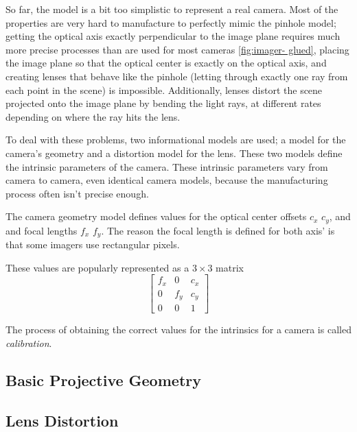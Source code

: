 So far, the model is a bit too simplistic to represent a real camera. Most of
the properties are very hard to manufacture to perfectly mimic the pinhole
model; getting the optical axis exactly perpendicular to the image plane
requires much more precise processes than are used for most cameras
\ref{fig:imager- glued}, placing the image plane so that the optical center is
exactly on the optical axis, and creating lenses that behave like the pinhole
(letting through exactly one ray from each point in the scene) is impossible.
Additionally, lenses distort the scene projected onto the image plane by
bending the light rays, at different rates depending on where the ray hits the
lens.

To deal with these problems, two informational models are used; a model for
the camera's geometry and a distortion model for the lens. These two models
define the intrinsic parameters of the camera. These intrinsic parameters vary
from camera to camera, even identical camera models, because the manufacturing
process often isn't precise enough.

The camera geometry model defines values for the optical center offsets $c_x$
$c_y$, and and focal lengths $f_x$ $f_y$. The reason the focal length
is defined for both axis' is that some imagers use rectangular pixels.

These values are popularly represented as a $3\times3$ matrix
$$
\begin{bmatrix}
    f_x & 0   & c_x \\
    0   & f_y & c_y \\
    0   & 0   & 1
\end{bmatrix}
$$

The process of obtaining the correct values for the intrinsics for a camera is
called \emph{calibration}.

\subsection{Basic Projective Geometry}

\subsection{Lens Distortion}

